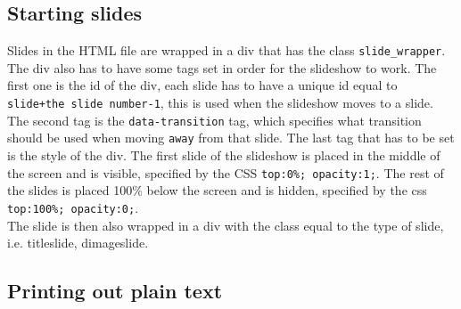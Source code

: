 \subsection{Starting slides}
Slides in the HTML file are wrapped in a div that has the class \texttt{slide\_wrapper}. The div also has to have some tags set in order for the slideshow to work. The first one is the id of the div, each slide has to have a unique id equal to \texttt{slide+the slide number-1}, this is used when the slideshow moves to a slide. The second tag is the \texttt{data-transition} tag, which specifies what transition should be used when moving \texttt{away} from that slide. The last tag that has to be set is the style of the div. The first slide of the slideshow is placed in the middle of the screen and is visible, specified by the CSS \texttt{top:0\%; opacity:1;}. The rest of the slides is placed 100\% below the screen and is hidden, specified by the css \texttt{top:100\%; opacity:0;}. \\
The slide is then also wrapped in a div with the class equal to the type of slide, i.e. titleslide, dimageslide.

\subsection{Printing out plain text}
